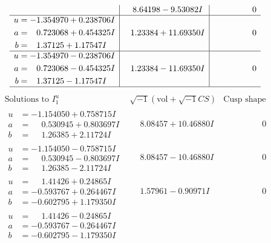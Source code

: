\documentclass[1p]{elsarticle_modified}
\theoremstyle{definition}
\newcommand{\I}{\sqrt{-1}}
\begin{document}
$$\begin{array}{c|c|c}
 & \phantom{-}8.64198 - 9.53082 I & \phantom{-0.000000 } 0 \\ \hline\begin{aligned}
u &= -1.354970 + 0.238706 I \\
a &= \phantom{-}0.723068 + 0.454325 I \\
b &= \phantom{-}1.37125 + 1.17547 I\end{aligned}
 & \phantom{-}1.23384 + 11.69350 I & \phantom{-0.000000 } 0 \\ \hline\begin{aligned}
u &= -1.354970 - 0.238706 I \\
a &= \phantom{-}0.723068 - 0.454325 I \\
b &= \phantom{-}1.37125 - 1.17547 I\end{aligned}
 & \phantom{-}1.23384 - 11.69350 I & \phantom{-0.000000 } 0\\
 \hline 
 \end{array}$$\newpage$$\begin{array}{c|c|c}  
\text{Solutions to }I^u_{1}& \I (\text{vol} + \sqrt{-1}CS) & \text{Cusp shape}\\
 \hline 
\begin{aligned}
u &= -1.154050 + 0.758715 I \\
a &= \phantom{-}0.530945 + 0.803697 I \\
b &= \phantom{-}1.26385 + 2.11724 I\end{aligned}
 & \phantom{-}8.08457 + 10.46880 I & \phantom{-0.000000 } 0 \\ \hline\begin{aligned}
u &= -1.154050 - 0.758715 I \\
a &= \phantom{-}0.530945 - 0.803697 I \\
b &= \phantom{-}1.26385 - 2.11724 I\end{aligned}
 & \phantom{-}8.08457 - 10.46880 I & \phantom{-0.000000 } 0 \\ \hline\begin{aligned}
u &= \phantom{-}1.41426 + 0.24865 I \\
a &= -0.593767 + 0.264467 I \\
b &= -0.602795 + 1.179350 I\end{aligned}
 & \phantom{-}1.57961 - 0.90971 I & \phantom{-0.000000 } 0 \\ \hline\begin{aligned}
u &= \phantom{-}1.41426 - 0.24865 I \\
a &= -0.593767 - 0.264467 I \\
b &= -0.602795 - 1.179350 I\end{aligned}

\end{array}$$
\end{document}
